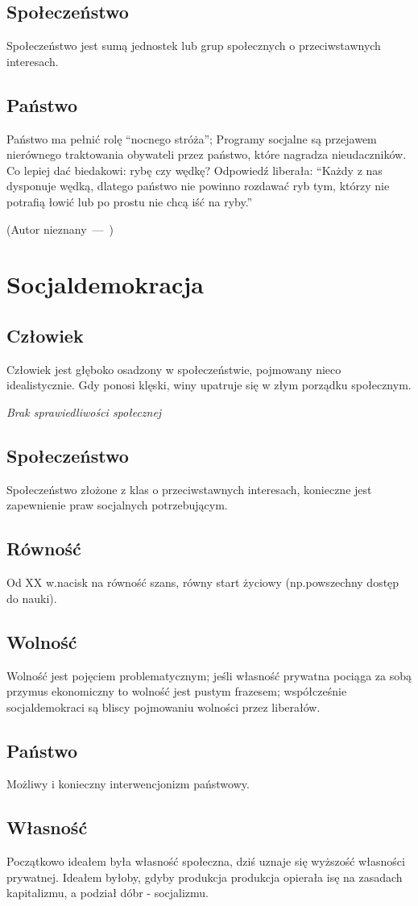 \documentclass[a4paper]{article}
\let\oldquote\quote
\let\endoldquote\endquote
\renewenvironment{quote}[2][]
  {\if\relax\detokenize{#1}\relax
     \def\quoteauthor{#2}%
   \else
     \def\quoteauthor{#2~---~#1}%
   \fi
   \oldquote}
  {\par\nobreak\smallskip\hfill(\quoteauthor)%
   \endoldquote\addvspace{\bigskipamount}}
\begin{document}
\subsection{Społeczeństwo}
Społeczeństwo jest sumą jednostek lub grup społecznych o przeciwstawnych interesach.
\subsection{Państwo}
Państwo ma pełnić rolę ``nocnego stróża''; Programy socjalne są przejawem nierównego traktowania
obywateli przez państwo, które nagradza nieudaczników.
\begin{quote}{Autor nieznany}
    Co lepiej dać biedakowi: rybę czy wędkę?
    Odpowiedź liberała: ``Każdy z nas dysponuje wędką, dlatego państwo nie powinno rozdawać ryb tym,
    którzy nie potrafią łowić lub po prostu nie chcą iść na ryby.''
\end{quote}
\section{Socjaldemokracja}
\subsection{Człowiek}
Człowiek jest głęboko osadzony w społeczeństwie, pojmowany nieco idealistycznie. Gdy ponosi klęski,
winy upatruje się w złym porządku społecznym.

\emph{Brak sprawiedliwości społecznej}
\subsection{Społeczeństwo}
Społeczeństwo złożone z klas o przeciwstawnych interesach, konieczne jest zapewnienie praw socjalnych
potrzebującym.
\subsection{Równość}
Od XX w.\@ nacisk na równość szans, równy start życiowy (np.\@ powszechny dostęp do nauki).
\subsection{Wolność}
Wolność jest pojęciem problematycznym; jeśli własność prywatna pociąga za sobą przymus ekonomiczny
to wolność jest pustym frazesem; współcześnie socjaldemokraci są bliscy pojmowaniu wolności przez
liberałów.
\subsection{Państwo}
Możliwy i konieczny interwencjonizm państwowy.
\subsection{Własność}
Początkowo ideałem była własność społeczna, dziś uznaje się wyższość własności prywatnej. Ideałem
byłoby, gdyby produkcja produkcja opierała isę na zasadach kapitalizmu, a podział dóbr - socjalizmu.
\end{document}
